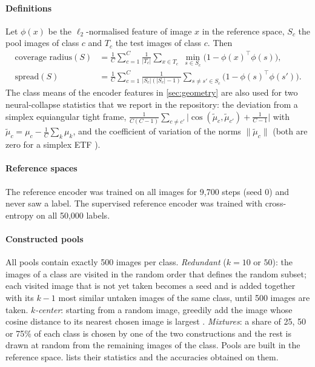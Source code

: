 \paragraph{Definitions}
Let $\phi(x)$ be the $\ell_2$-normalised feature of image $x$ in the reference space, $S_c$ the pool images
of class $c$ and $T_c$ the test images of class $c$. Then
\begin{align}
\text{coverage radius}(S) &= \frac{1}{C}\sum_{c=1}^{C}\frac{1}{|T_c|}\sum_{x\in T_c}\;\min_{s\in S_c}\bigl(1-\phi(x)^\top\phi(s)\bigr), \\
\text{spread}(S) &= \frac{1}{C}\sum_{c=1}^{C}\frac{1}{|S_c|(|S_c|-1)}\sum_{s\neq s'\in S_c}\bigl(1-\phi(s)^\top\phi(s')\bigr).
\end{align}
The class means of the encoder features in \cref{sec:geometry} are also used for two neural-collapse
statistics that we report in the repository: the deviation from a simplex equiangular tight frame,
$\frac{1}{C(C-1)}\sum_{c\neq c'}\bigl|\cos(\tilde\mu_c,\tilde\mu_{c'})+\tfrac{1}{C-1}\bigr|$ with
$\tilde\mu_c=\mu_c-\frac1C\sum_{k}\mu_k$, and the coefficient of variation of the norms
$\lVert\tilde\mu_c\rVert$ (both are zero for a simplex ETF \citep{papyan2020neural}).

\paragraph{Reference spaces}
The \simclr reference encoder was trained on all images for 9,700 steps (seed 0) and never saw a label. The
supervised reference encoder was trained with cross-entropy on all 50,000 labels.

\paragraph{Constructed pools}
All pools contain exactly 500 images per class.
\emph{Redundant} ($k=10$ or $50$): the images of a class are visited in the random order that defines the
random subset; each visited image that is not yet taken becomes a seed and is added together with its
$k-1$ most similar untaken images of the same class, until 500 images are taken.
\emph{$k$-center}: starting from a random image, greedily add the image whose cosine distance to its nearest
chosen image is largest \citep{sener2018coreset}.
\emph{Mixtures}: a share of 25, 50 or 75\% of each class is chosen by one of the two constructions and the
rest is drawn at random from the remaining images of the class.
Pools are built in the \simclr reference space.  lists their statistics and the
accuracies obtained on them.

